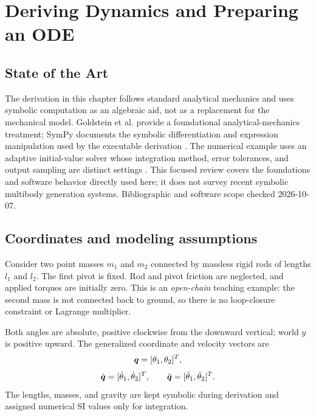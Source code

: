 \documentclass[../main.tex]{subfiles}
\begin{document}
\chapter{Deriving Dynamics and Preparing an ODE}
\label{chap:derive-dynamics}

\section{State of the Art}
The derivation in this chapter follows standard analytical mechanics and uses symbolic computation as an algebraic aid, not as a replacement for the mechanical model. Goldstein et al. provide a foundational analytical-mechanics treatment; SymPy documents the symbolic differentiation and expression manipulation used by the executable derivation \cite{goldstein2002classical,meurer2017sympy}. The numerical example uses an adaptive initial-value solver whose integration method, error tolerances, and output sampling are distinct settings \cite{scipy_solve_ivp}. This focused review covers the foundations and software behavior directly used here; it does not survey recent symbolic multibody generation systems. Bibliographic and software scope checked 2026-10-07.

\section{Coordinates and modeling assumptions}

Consider two point masses $m_1$ and $m_2$ connected by massless rigid rods of lengths $l_1$ and $l_2$. The first pivot is fixed. Rod and pivot friction are neglected, and applied torques are initially zero. This is an \emph{open-chain} teaching example: the second mass is not connected back to ground, so there is no loop-closure constraint or Lagrange multiplier.

Both angles are absolute, positive clockwise from the downward vertical; world $y$ is positive upward. The generalized coordinate and velocity vectors are
\begin{equation}
	\boldsymbol{q} = [\theta_1,\theta_2]^T,
	\label{eq:double-pendulum-q}
\end{equation}
\begin{equation}
	\dot{\boldsymbol{q}} = [\dot{\theta}_1,\dot{\theta}_2]^T,
	\qquad
	\ddot{\boldsymbol{q}} = [\ddot{\theta}_1,\ddot{\theta}_2]^T.
	\label{eq:double-pendulum-qdot}
\end{equation}
The lengths, masses, and gravity are kept symbolic during derivation and assigned numerical SI values only for integration.
\end{document}
